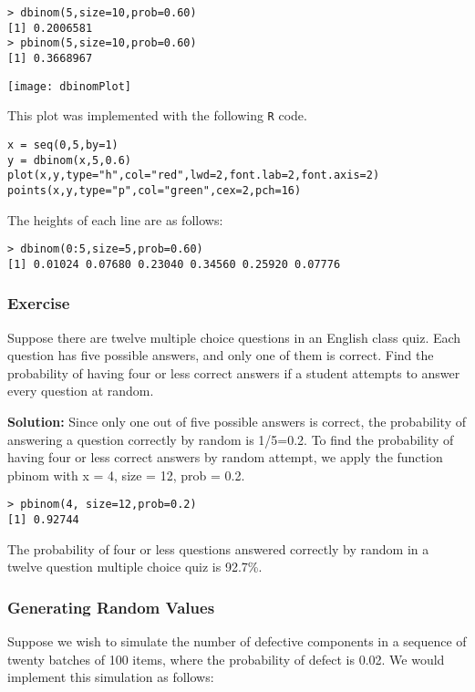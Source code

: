 \documentclass[a4paper,12pt]{article}
\begin{document}
\begin{verbatim}
> dbinom(5,size=10,prob=0.60)
[1] 0.2006581
> pbinom(5,size=10,prob=0.60)
[1] 0.3668967
\end{verbatim}

 \begin{center}
 \texttt{[image: dbinomPlot]}
 \end{center}
 
This plot was implemented with the following \texttt{R} code.

\begin{verbatim}
x = seq(0,5,by=1)
y = dbinom(x,5,0.6)
plot(x,y,type="h",col="red",lwd=2,font.lab=2,font.axis=2)
points(x,y,type="p",col="green",cex=2,pch=16)
\end{verbatim}

The heights of each line are as follows:
\begin{verbatim}
> dbinom(0:5,size=5,prob=0.60)
[1] 0.01024 0.07680 0.23040 0.34560 0.25920 0.07776
\end{verbatim}

\subsubsection{Exercise}
Suppose there are twelve multiple choice questions in an English class quiz. Each question has five possible answers, and only one of them is correct. Find the probability of having four or less correct answers if a student attempts to answer every question at random. 

\textbf{Solution:} Since only one out of five possible answers is correct, the probability of answering a question correctly by random is 1/5=0.2. To find the probability of having four or less correct answers by random attempt, we apply the function pbinom with x = 4, size = 12, prob = 0.2. 

\begin{verbatim}
> pbinom(4, size=12,prob=0.2) 
[1] 0.92744 
\end{verbatim}

The probability of four or less questions answered correctly by random in a twelve question multiple choice quiz is 92.7\%. 
 
\subsubsection{Generating Random Values}

Suppose we wish to simulate the number of defective components in a sequence of twenty batches of 100 items, where the probability of defect is 0.02. We would implement this simulation as follows:
\end{document}

